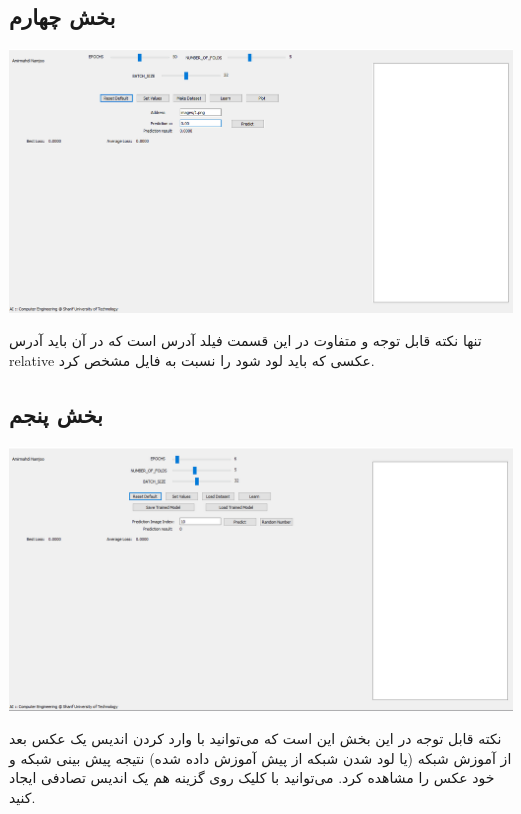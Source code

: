 \documentclass[12pt,titlepage,a4page , tikz , multi,table , svgnames,xcdraw]{article}
\begin{document}
\newpage



\subsection{بخش چهارم}

\begin{center}

 \includegraphics[width=1.1\textwidth]{pictures/27.png}

\end{center}

تنها نکته قابل توجه و متفاوت در این قسمت فیلد آدرس است که در آن باید آدرس relative عکسی که باید لود شود را نسبت به فایل  مشخص کرد.


\subsection{بخش پنجم}

\begin{center}

 \includegraphics[width=1.1\textwidth]{pictures/28.png}

\end{center}
نکته قابل توجه در این بخش این است که می‌توانید با وارد کردن اندیس یک عکس بعد از آموزش شبکه (یا لود شدن شبکه از پیش آموزش داده شده) نتیجه پیش بینی شبکه و خود عکس را مشاهده کرد. می‌توانید با کلیک روی گزینه  هم یک اندیس تصادفی ایجاد کنید.
\end{document}
